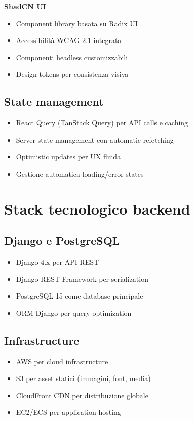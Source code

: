 \textbf{ShadCN UI}
\begin{itemize}
  \item Component library basata su Radix UI
  \item Accessibilità WCAG 2.1 integrata
  \item Componenti headless customizzabili
  \item Design tokens per consistenza visiva
\end{itemize}

\subsection{State management}
\begin{itemize}
  \item React Query (TanStack Query) per API calls e caching
  \item Server state management con automatic refetching
  \item Optimistic updates per UX fluida
  \item Gestione automatica loading/error states
\end{itemize}

\section{Stack tecnologico backend}
\subsection{Django e PostgreSQL}
\begin{itemize}
  \item Django 4.x per API REST
  \item Django REST Framework per serialization
  \item PostgreSQL 15 come database principale
  \item ORM Django per query optimization
\end{itemize}

\subsection{Infrastructure}
\begin{itemize}
  \item AWS per cloud infrastructure
  \item S3 per asset statici (immagini, font, media)
  \item CloudFront CDN per distribuzione globale
  \item EC2/ECS per application hosting
\end{itemize}


